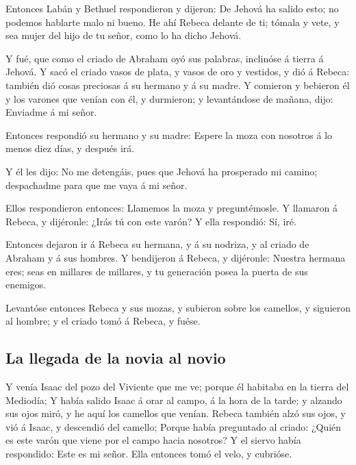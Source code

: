  Entonces Labán y Bethuel respondieron y dijeron: De Jehová
ha salido esto; no podemos hablarte malo ni bueno.  He ahí
Rebeca delante de ti; tómala y vete, y sea mujer del hijo de tu señor,
como lo ha dicho Jehová.

 Y fué, que como el criado de Abraham oyó sus palabras,
inclinóse á tierra á Jehová.  Y sacó el criado vasos de
plata, y vasos de oro y vestidos, y dió á Rebeca: también dió cosas
preciosas á su hermano y á su madre.  Y comieron y bebieron
él y los varones que venían con él, y durmieron; y levantándose de
mañana, dijo: Enviadme á mi señor.

 Entonces respondió su hermano y su madre: Espere la moza
con nosotros á lo menos diez días, y después irá.

 Y él les dijo: No me detengáis, pues que Jehová ha
prosperado mi camino; despachadme para que me vaya á mi señor.

 Ellos respondieron entonces: Llamemos la moza y
preguntémosle.  Y llamaron á Rebeca, y dijéronle: ¿Irás tú
con este varón? Y ella respondió: Sí, iré.

 Entonces dejaron ir á Rebeca su hermana, y á su nodriza, y
al criado de Abraham y á sus hombres.  Y bendijeron á
Rebeca, y dijéronle: Nuestra hermana eres; seas en millares de millares,
y tu generación posea la puerta de sus enemigos.

 Levantóse entonces Rebeca y sus mozas, y subieron sobre
los camellos, y siguieron al hombre; y el criado tomó á Rebeca, y fuése.

\hypertarget{la-llegada-de-la-novia-al-novio}{%
\subsection{La llegada de la novia al
novio}\label{la-llegada-de-la-novia-al-novio}}

 Y venía Isaac del pozo del Viviente que me ve; porque él
habitaba en la tierra del Mediodía;  Y había salido Isaac á
orar al campo, á la hora de la tarde; y alzando sus ojos miró, y he aquí
los camellos que venían.  Rebeca también alzó sus ojos, y
vió á Isaac, y descendió del camello;  Porque había
preguntado al criado: ¿Quién es este varón que viene por el campo hacia
nosotros? Y el siervo había respondido: Este es mi señor. Ella entonces
tomó el velo, y cubrióse.

